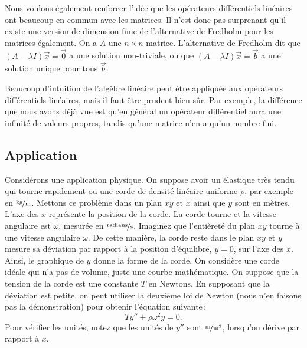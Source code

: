 Nous voulons également renforcer l'idée que les opérateurs différentiels linéaires ont
beaucoup en commun avec les matrices. Il n'est donc pas surprenant qu'il existe une version de dimension finie de l'alternative de Fredholm pour les matrices  également.  On a $A$ une $n \times n$ matrice.  L'alternative de Fredholm dit que $(A-\lambda I) \vec{x}
= \vec{0}$ a une solution non-triviale, ou que $(A-\lambda I) \vec{x} = \vec{b}$
a une solution unique pour tous $\vec{b}$.

Beaucoup d'intuition de l'algèbre linéaire peut être appliquée aux opérateurs différentiels linéaires, mais il faut être prudent bien sûr. Par exemple, la différence que nous avons déjà vue est qu'en général un opérateur différentiel
aura une infinité de valeurs propres, tandis qu'une matrice n'en a qu'un nombre fini.


\subsection{Application}

Considérons une application physique. On suppose avoir un élastique très tendu qui tourne rapidement ou une corde de densité linéaire uniforme $\rho$, par exemple en
$\unitfrac{kg}{m}$.
Mettons ce problème dans un plan $xy$ et $x$ ainsi que $y$
sont en mètres.  L'axe des $x$ représente la position de la corde. La corde tourne et la vitesse angulaire est $\omega$, mesurée
en $\unitfrac{radians}{s}$.
Imaginez que l'entièreté du plan $xy$ tourne à une vitesse angulaire  $\omega$.
De cette manière, la corde reste dans le plan $xy$ et $y$ 
mesure sa déviation par rapport à la position d'équilibre, $y=0$, sur l'axe des $x$.
Ainsi, le graphique de $y$ donne la forme de la corde.
On considère une corde idéale qui n'a pas de volume, juste une courbe mathématique. On suppose que la tension de la corde est une constante $T$ en Newtons.
En supposant que la déviation est petite, on peut utiliser la deuxième loi de Newton (nous n'en faisons pas la démonstration) pour obtenir l'équation suivante\,: 
\begin{equation*}
T y'' + \rho \omega^2 y = 0 .
\end{equation*}
Pour vérifier les unités, notez que les unités de $y''$ sont $\unitfrac{m}{m^2}$, lorsqu'on dérive par rapport à $x$.

